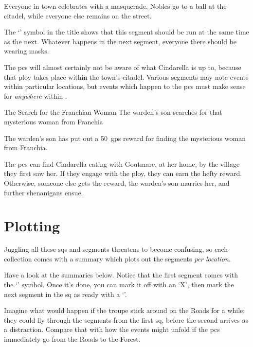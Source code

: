 \begin{multicols}{2}
Everyone in town celebrates with a masquerade.
Nobles go to a ball at the citadel, while everyone else remains on the street.

The `\squash' symbol in the title shows that this \gls{segment} should be run at the same time as the next.
Whatever happens in the next \gls{segment}, everyone there should be wearing masks.

The \glspl{pc} will almost certainly not be aware of what Cindarella is up to, because that ploy takes place within the town's citadel.
Various \glspl{segment} may note events within particular locations, but events which happen to the \glspl{pc} must make sense for \textit{anywhere} within .

{The Search for the Franchian Woman}%
{The \gls{warden}'s son searches for that mysterious woman from Franchia}%

\begin{exampletext}
  The \gls{warden}'s son has put out a 50~\glspl{gp} reward for finding the mysterious woman from Franchia.
\end{exampletext}

The \glspl{pc} can find Cindarella eating with Goutmare, at her home, by the \gls{village} they first saw her.
If they engage with the ploy, they can earn the hefty reward.
Otherwise, someone else gets the reward, the \gls{warden}'s son marries her, and further shenanigans ensue.


\end{multicols}

\section{Plotting }

\begin{multicols}{2}

\noindent
Juggling all these \glspl{sq} and \glspl{segment} threatens to become confusing, so each collection comes with a summary which plots out the \glspl{segment} \emph{per location}.

Have a look at the summaries below.
Notice that the first \gls{segment} comes with the `\sqr' symbol.
Once it's done, you can mark it off with an `X', then mark the next \gls{segment} in the \gls{sq} as ready with a `\sqr'.

Imagine what would happen if the troupe stick around on the Roads for a while; they could fly through the \glspl{segment} from the first \gls{sq}, before the second arrives as a distraction.
Compare that with how the events might unfold if the \glspl{pc} immediately go from the Roads to the Forest.

\end{multicols}

